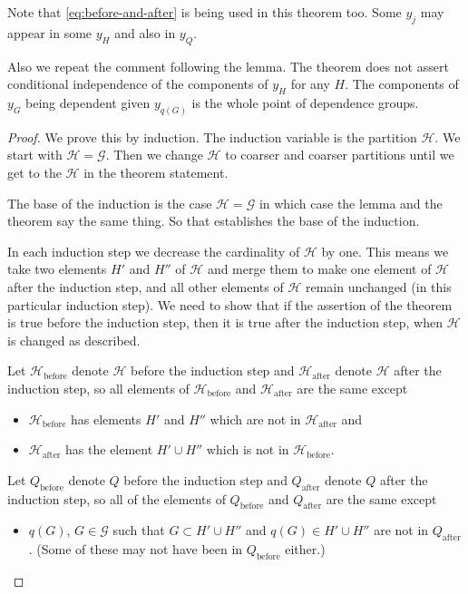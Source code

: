 Note that \eqref{eq:before-and-after} is being used in this theorem too.
Some $y_j$ may appear in some $y_H$ and also in $y_Q$.

Also we repeat the comment following the lemma.  The theorem does not
assert conditional independence of the components of $y_H$ for any $H$.
The components of $y_G$ being dependent given $y_{q(G)}$ is the whole
point of dependence groups.

\begin{proof}
We prove this by induction. The induction variable is the partition
$\mathcal{H}$. We start with $\mathcal{H} = \mathcal{G}$.
Then we change $\mathcal{H}$ to coarser and coarser
partitions until we get to the $\mathcal{H}$ in the theorem statement.

The base of the induction is the case $\mathcal{H} = \mathcal{G}$
in which case the lemma and the theorem say the same thing.
So that establishes the base of the induction.

In each induction step we decrease the cardinality of $\mathcal{H}$ by one.
This means we take two elements $H'$ and $H''$ of $\mathcal{H}$ and merge
them to make one element of $\mathcal{H}$ after the induction step,
and all other elements of $\mathcal{H}$ remain
unchanged (in this particular induction step). We need to show that if the
assertion of the theorem is true before the induction step, then it is true
after the induction step, when $\mathcal{H}$ is changed as described.

Let $\mathcal{H}_\text{before}$ denote $\mathcal{H}$ before the induction step
and $\mathcal{H}_\text{after}$ denote $\mathcal{H}$ after
the induction step, so all elements of $\mathcal{H}_\text{before}$
and $\mathcal{H}_\text{after}$ are the same except
\begin{itemize}
\item $\mathcal{H}_\text{before}$ has elements $H'$ and $H''$ which are not
    in $\mathcal{H}_\text{after}$ and
\item $\mathcal{H}_\text{after}$ has the element $H' \cup H''$ which is not
    in $\mathcal{H}_\text{before}$.
\end{itemize}
Let $Q_\text{before}$ denote $Q$ before the induction step and $Q_\text{after}$
denote $Q$ after the induction step, so all of the elements
of $Q_\text{before}$ and $Q_\text{after}$ are the same except
\begin{itemize}
\item $q(G)$, $G \in \mathcal{G}$ such that $G \subset H' \cup H''$
    and $q(G) \in H' \cup H''$ are not in $Q_\text{after}$.
    (Some of these may not have been in $Q_\text{before}$ either.)
\end{itemize}


\end{proof}
